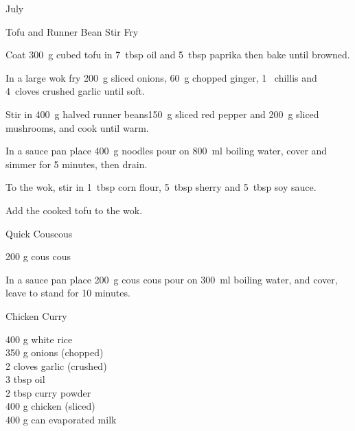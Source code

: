 \begin{menu}{July}
\begin{recipe}{2}{Tofu and Runner Bean Stir Fry}
    \begin{instructions}
    \item 
        Coat
        300~g cubed tofu
        in
        7~tbsp  oil
        and
        5~tbsp  paprika
        then bake until browned.
      \item 
        In a large wok fry 200~g sliced onions,
        60~g chopped ginger,
        1~  chillis
        and
        4~cloves crushed garlic
        until soft.
      \item 
        Stir in
        400~g halved runner beans150~g sliced red pepper
        and
        200~g sliced mushrooms,
        and cook until warm.
      \item 
      In a 
      sauce pan
      place
      400~g  noodles
      pour on
      800~ml  boiling water,
      cover and simmer for 5 minutes, then drain.
    \item 
        To the wok, stir in
        1~tbsp  corn flour,
        5~tbsp  sherry
        and
        5~tbsp  soy sauce.
      \item 
        Add the cooked tofu to the wok.
      
    \end{instructions}
    \end{recipe}%
  
    \begin{recipe}{1}{Quick Couscous}%
		\begin{ingredients}
		200 g cous cous  \\
	
		\end{ingredients}
	
    \begin{instructions}
    \item 
      In a
      sauce pan 
      place
      200~g  cous cous
      pour on
      300~ml  boiling water,
      and cover, leave to stand for 10 minutes.
    
    \end{instructions}
    \end{recipe}%
  
    \begin{recipe}{2}{Chicken Curry}%
		\begin{ingredients}
		400 g white rice  \\
	350 g onions (chopped) \\
	2 cloves garlic (crushed) \\
	3 tbsp oil  \\
	2 tbsp curry powder  \\
	400 g chicken (sliced) \\
	400 g can evaporated milk  \\
	

\end{ingredients}
\end{recipe}
\end{menu}
